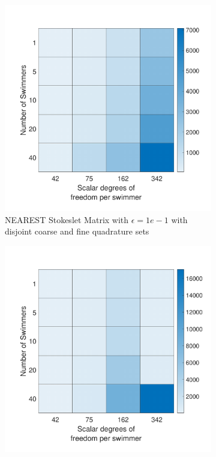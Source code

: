 \begin{figure}
\ContinuedFloat
    \begin{subfigure}{0.3\textwidth}
        \includegraphics[width=\linewidth]{Images/Condition/Stokeslet Matrix using Disjoint NEAREST-1.pdf}
        \caption{NEAREST Stokeslet Matrix with $\epsilon=1e-1$ with disjoint coarse and fine quadrature sets}
    \end{subfigure}
    \begin{subfigure}{0.3\textwidth}
        \includegraphics[width=\linewidth]{Images/Condition/Stokeslet Matrix using Disjoint NEAREST-2.pdf}

\end{subfigure}
\end{figure}
